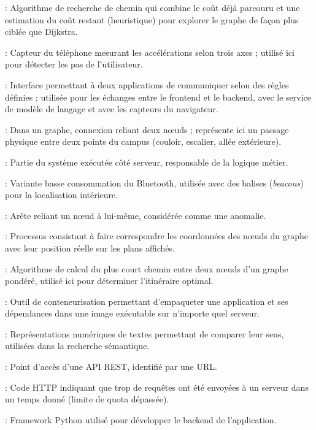 \documentclass[12pt,a4paper]{report}
\begin{document}
\begin{description}[leftmargin=0pt, itemsep=0.3em]
\item[A*] : Algorithme de recherche de chemin qui combine le coût déjà parcouru et une estimation du
coût restant (heuristique) pour explorer le graphe de façon plus ciblée que Dijkstra.
\item[Accéléromètre] : Capteur du téléphone mesurant les accélérations selon trois axes ; utilisé
ici pour détecter les pas de l'utilisateur.
\item[API (Application Programming Interface)] : Interface permettant à deux applications de
communiquer selon des règles définies ; utilisée pour les échanges entre le frontend et le backend,
avec le service de modèle de langage et avec les capteurs du navigateur.
\item[Arête] : Dans un graphe, connexion reliant deux nœuds ; représente ici un passage physique
entre deux points du campus (couloir, escalier, allée extérieure).
\item[Backend] : Partie du système exécutée côté serveur, responsable de la logique métier.
\item[BLE (Bluetooth Low Energy)] : Variante basse consommation du Bluetooth, utilisée avec des
balises (\emph{beacons}) pour la localisation intérieure.
\item[Boucle (self-loop)] : Arête reliant un nœud à lui-même, considérée comme une anomalie.
\item[Calibration] : Processus consistant à faire correspondre les coordonnées des nœuds du graphe
avec leur position réelle sur les plans affichés.
\item[Dijkstra] : Algorithme de calcul du plus court chemin entre deux nœuds d'un graphe pondéré,
utilisé ici pour déterminer l'itinéraire optimal.
\item[Docker] : Outil de conteneurisation permettant d'empaqueter une application et ses
dépendances dans une image exécutable sur n'importe quel serveur.
\item[Embeddings] : Représentations numériques de textes permettant de comparer leur sens, utilisées
dans la recherche sémantique.
\item[Endpoint] : Point d'accès d'une API REST, identifié par une URL.
\item[Erreur 429] : Code HTTP indiquant que trop de requêtes ont été envoyées à un serveur dans un
temps donné (limite de quota dépassée).
\item[FastAPI] : Framework Python utilisé pour développer le backend de l'application.

\end{description}
\end{document}
